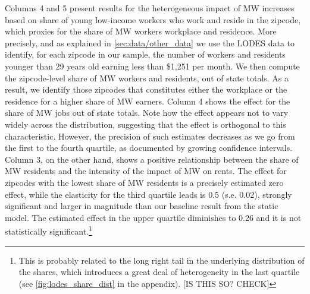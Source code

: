 


Columns 4 and 5 present results for the heterogeneous impact of MW increases based on share of 
young low-income workers who work and reside in the zipcode, which proxies for the share of MW 
workers workplace and residence. More precisely, and as explained in \autoref{sec:data/other_data} 
we use the LODES data to identify, for each zipcode in our sample, the number of workers and 
residents younger than 29 years old earning less than \$1,251 per month. 
We then compute the zipcode-level share of MW workers and residents, out of state totals. As a 
result, we identify those zipcodes that constitutes either the workplace or the residence for a 
higher share of MW earners. Column 4 shows the effect for the share of MW jobs out of state totals. 
Note how the effect appears not to vary widely across the distribution, suggesting that the effect 
is orthogonal to this characteristic. However, the precision of such estimates decreases as we go 
from the first to the fourth quartile, as documented by growing confidence intervals. Column 3, on 
the other hand, shows a positive relationship between the share of MW residents and the intensity 
of the impact of MW on rents. The effect for zipcodes with the lowest share of MW residents is a 
precisely estimated zero effect, while the elasticity for the third quartile leads is 0.5 (s.e. 
0.02), strongly significant and larger in magnitude than our baseline result from the static model. 
The estimated effect in the upper quartile diminishes to 0.26 and it is not statistically 
significant.\footnote{\label{ft:long_tail}  %
	This is probably related to the long right tail in the underlying distribution of the shares, 
	which introduces a great deal of heterogeneity in the last quartile (see 
	\autoref{fig:lodes_share_dist} in the appendix). [IS THIS SO? CHECK]}

